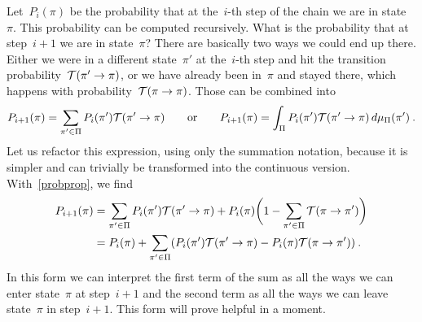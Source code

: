Let~$P_i(\pi)$ be the probability that at the~$i$-th step of
the chain we are in state~$\pi$. This probability can be computed recursively.
What is the probability that at step~$i+1$ we are in state~$\pi$? There are
basically two ways we could end up there. Either we were in a different
state~$\pi'$ at the~$i$-th step and hit the transition probability~$\mathcal{T}(\pi' \to
\pi)$, or we have already been in~$\pi$ and stayed there, which happens with
probability~$\mathcal{T}(\pi \to \pi)$. Those can be combined into
%
\begin{equation}\label{master}
  P_{i+1}(\pi) = \sum_{\pi' \in \Pi} P_i(\pi') \mathcal{T}(\pi' \to \pi) \qquad\text{or}\qquad
  P_{i+1}(\pi) = \int_{\Pi} P_i(\pi') \mathcal{T}(\pi' \to \pi) \,d\mu_{\Pi}(\pi')\:.
\end{equation}
%
Let us refactor this expression, using only the summation notation, because it
is simpler and can trivially be transformed into the continuous version.
With~\eqref{probprop}, we find
%
\begin{align}\label{masterlong}
  P_{i+1}(\pi) &= \sum_{\pi' \in \Pi} P_i(\pi') \mathcal{T}(\pi' \to \pi) +
    P_i(\pi) \biggl(1 - \sum_{\pi' \in \Pi} \mathcal{T}(\pi \to \pi')\biggr)\nonumber \\
  &= P_i(\pi) + \sum_{\pi' \in \Pi}
    (P_i(\pi') \mathcal{T}(\pi' \to \pi) - P_i(\pi) \mathcal{T}(\pi \to \pi'))\:.
\end{align}
%
In this form we can interpret the first term of the sum as all the ways we can
enter state~$\pi$ at step~$i+1$ and the second term as all the ways we can leave
state~$\pi$ in step~$i+1$. This form will prove helpful in a moment.

